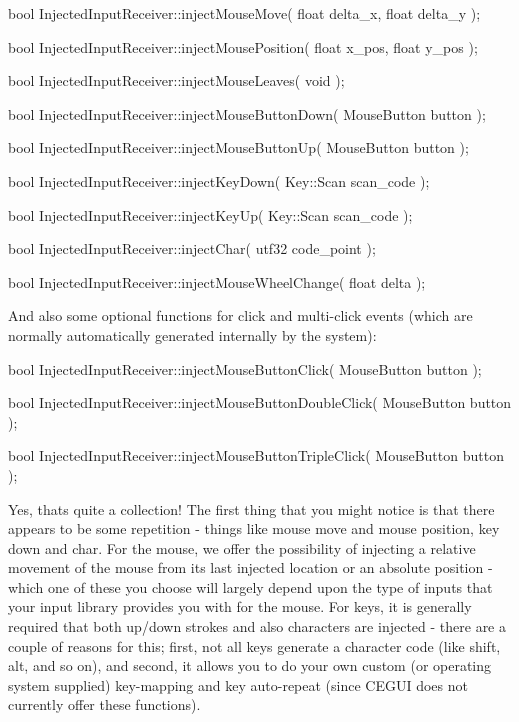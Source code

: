 \begin{DoxyItemize}
\item bool Injected\+Input\+Receiver\+::inject\+Mouse\+Move( float delta\+\_\+x, float delta\+\_\+y );
\item bool Injected\+Input\+Receiver\+::inject\+Mouse\+Position( float x\+\_\+pos, float y\+\_\+pos );
\item bool Injected\+Input\+Receiver\+::inject\+Mouse\+Leaves( void );
\item bool Injected\+Input\+Receiver\+::inject\+Mouse\+Button\+Down( Mouse\+Button button );
\item bool Injected\+Input\+Receiver\+::inject\+Mouse\+Button\+Up( Mouse\+Button button );
\item bool Injected\+Input\+Receiver\+::inject\+Key\+Down( Key\+::\+Scan scan\+\_\+code );
\item bool Injected\+Input\+Receiver\+::inject\+Key\+Up( Key\+::\+Scan scan\+\_\+code );
\item bool Injected\+Input\+Receiver\+::inject\+Char( utf32 code\+\_\+point );
\item bool Injected\+Input\+Receiver\+::inject\+Mouse\+Wheel\+Change( float delta );
\end{DoxyItemize}

And also some optional functions for click and multi-\/click events (which are normally automatically generated internally by the system)\+:
\begin{DoxyItemize}
\item bool Injected\+Input\+Receiver\+::inject\+Mouse\+Button\+Click( Mouse\+Button button );
\item bool Injected\+Input\+Receiver\+::inject\+Mouse\+Button\+Double\+Click( Mouse\+Button button );
\item bool Injected\+Input\+Receiver\+::inject\+Mouse\+Button\+Triple\+Click( Mouse\+Button button );
\end{DoxyItemize}

Yes, that\textquotesingle{}s quite a collection! The first thing that you might notice is that there appears to be some repetition -\/ things like \textquotesingle{}mouse move\textquotesingle{} and \textquotesingle{}mouse position\textquotesingle{}, \textquotesingle{}key down\textquotesingle{} and \textquotesingle{}char\textquotesingle{}. For the mouse, we offer the possibility of injecting a relative movement of the mouse from it\textquotesingle{}s last injected location or an absolute position -\/ which one of these you choose will largely depend upon the type of inputs that your input library provides you with for the mouse. For keys, it is generally required that both up/down strokes and also characters are injected -\/ there are a couple of reasons for this; first, not all keys generate a character code (like shift, alt, and so on), and second, it allows you to do your own custom (or operating system supplied) key-\/mapping and key auto-\/repeat (since C\+E\+G\+UI does not currently offer these functions).

